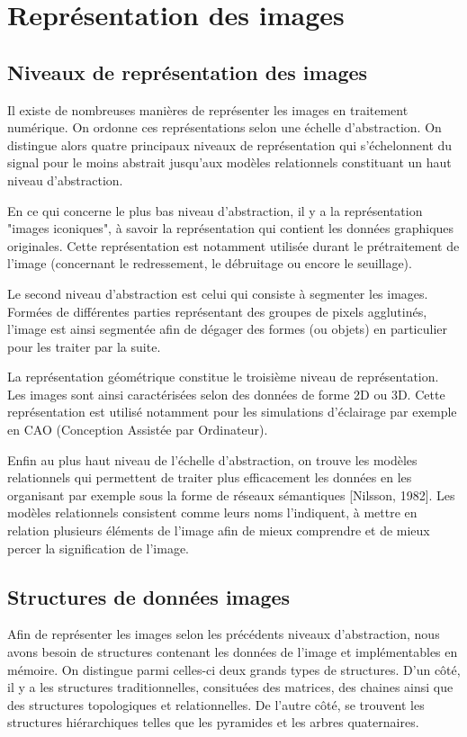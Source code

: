 \documentclass[]{report}
\begin{document}

  \chapter{Repr\'esentation des images} %
	\label{cha:repr'esentation_des_images}


    \section{Niveaux de repr\'esentation des images} %
    \label{sec:niveaux_de_repr'esentation_des_images}
  		Il existe de nombreuses manières de représenter les images en traitement numérique. On ordonne ces représentations selon une échelle d'abstraction. On distingue alors quatre principaux niveaux de représentation qui s'échelonnent du signal pour le moins abstrait jusqu'aux modèles relationnels constituant un haut niveau d'abstraction.

      En ce qui concerne le plus bas niveau d'abstraction, il y a la représentation "images iconiques", à savoir la représentation qui contient les données graphiques originales. Cette représentation est notamment utilisée durant le prétraitement de l'image (concernant le redressement, le débruitage ou encore le seuillage).

      Le second niveau d'abstraction est celui qui consiste à segmenter les images. Formées de différentes parties représentant des groupes de pixels agglutinés, l'image est ainsi segmentée afin de dégager des formes (ou objets) en particulier pour les traiter par la suite.

      La représentation géométrique constitue le troisième niveau de représentation. Les images sont ainsi caractérisées selon des données de forme 2D ou 3D. Cette représentation est utilisé notamment pour les simulations d'éclairage par exemple en CAO (Conception Assistée par Ordinateur).

      Enfin au plus haut niveau de l'échelle d'abstraction, on trouve les modèles relationnels qui permettent de traiter plus efficacement les données en les organisant par exemple sous la forme de réseaux sémantiques [Nilsson, 1982]. Les modèles relationnels consistent comme leurs noms l'indiquent, à mettre en relation plusieurs éléments de l'image afin de mieux comprendre et de mieux percer la signification de l'image.


    \section{Structures de donn\'ees images} %
    \label{sec:structures_de_donn'ees_images}
      Afin de représenter les images selon les précédents niveaux d'abstraction, nous avons besoin de structures contenant les données de l'image et implémentables en mémoire. On distingue parmi celles-ci deux grands types de structures. D'un côté, il y a les structures traditionnelles, consituées des matrices, des chaines ainsi que des structures topologiques et relationnelles. De l'autre côté, se trouvent les structures hiérarchiques telles que les pyramides et les arbres quaternaires.
\end{document}
